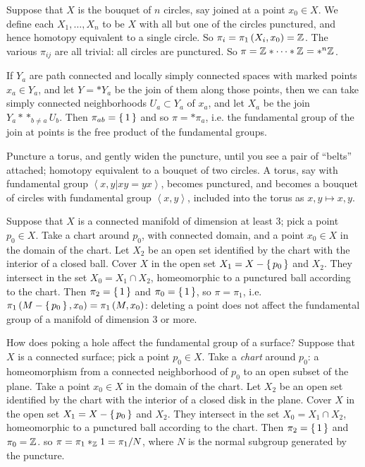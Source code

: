 \begin{example}
Suppose that \(X\) is the bouquet of \(n\) circles, say joined at a point \(x_0 \in X\).
We define each \(X_1,\dots,X_n\) to be \(X\) with all but one of the circles punctured, and hence homotopy equivalent to a single circle.
So \(\pi_i=\pi_{1}\left(X_i,x_0\right)=\mathbb{Z}^{}\).
The various \(\pi_{ij}\) are all trivial: all circles are punctured.
So \(\pi=\mathbb{Z}^{} * \dots * \mathbb{Z}^{}=*^n \mathbb{Z}^{}\).
\end{example}
\begin{example}
If \(Y_a\) are path connected and locally simply connected spaces with marked points \(x_a \in Y_a\), and let \(Y=*Y_a\) be the join of them along those points, then we can take simply connected neighborhoods \(U_a \subset Y_a\) of \(x_a\), and let \(X_a\) be the join \(Y_a* *_{b\ne a} U_b\).
Then \(\pi_{ab} = \set{1}\) and so \(\pi=*\pi_a\), i.e. the fundamental group of the join at points is the free product of the fundamental groups.
\end{example}
\begin{example}
Puncture a torus, and gently widen the puncture, until you see a pair of ``belts'' attached; homotopy equivalent to a bouquet of two circles.
A torus, say with fundamental group \(\left<x,y|xy=yx\right>\), becomes punctured, and becomes a bouquet of circles with fundamental group \(\left<x,y\right>\), included into the torus as \(x,y\mapsto x,y\).
\end{example}
\begin{example}
Suppose that \(X\) is a connected manifold of dimension at least 3; pick a point \(p_0 \in X\).
Take a chart around \(p_0\), with connected domain, and a point \(x_0 \in X\) in the domain of the chart.
Let \(X_2\) be an open set identified by the chart with the interior of a closed ball.
Cover \(X\) in the open set \(X_1=X-\set{p_0}\) and \(X_2\).
They intersect in the set \(X_0=X_1\cap X_2\), homeomorphic to a punctured ball according to the chart.
Then \(\pi_2=\set{1}\) and \(\pi_0=\set{1}\), so \(\pi=\pi_1\), i.e. \(\pi_{1}\left(M-\set{p_0},x_0\right)=\pi_{1}\left(M,x_0\right)\): deleting a point does not affect the fundamental group of a manifold of dimension 3 or more.
\end{example}
\begin{example}
How does poking a hole affect the fundamental group of a surface?
Suppose that \(X\) is a connected surface; pick a point \(p_0 \in X\).
Take a \emph{chart} around \(p_0\): a homeomorphism from a connected neighborhood of \(p_0\) to an open subset of the plane.
Take a point \(x_0 \in X\) in the domain of the chart.
Let \(X_2\) be an open set identified by the chart with the interior of a closed disk in the plane.
Cover \(X\) in the open set \(X_1=X-\set{p_0}\) and \(X_2\).
They intersect in the set \(X_0=X_1\cap X_2\), homeomorphic to a punctured ball according to the chart.
Then \(\pi_2=\set{1}\) and \(\pi_0=\mathbb{Z}^{}\).
so \(\pi=\pi_1*_{\mathbb{Z}^{}} 1=\pi_1/N\), where \(N\) is the normal subgroup generated by the puncture.
\end{example}
